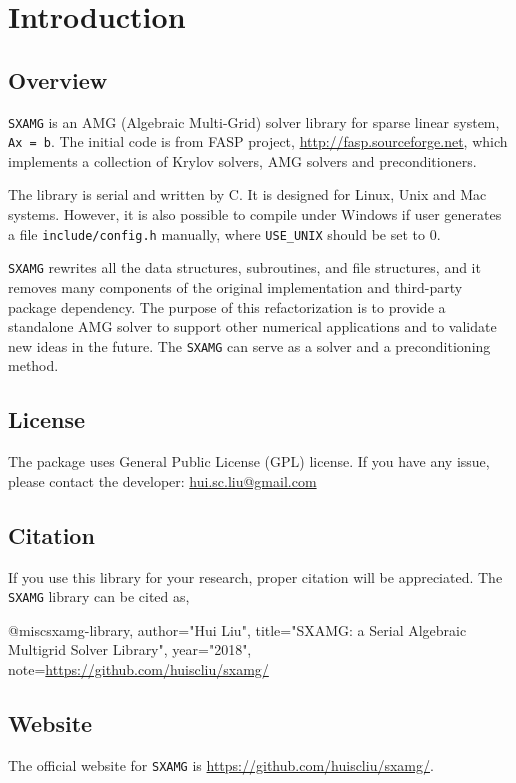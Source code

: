 
\chapter{Introduction}

\section{Overview}

\verb|SXAMG| is an AMG (Algebraic Multi-Grid) solver 
library for sparse linear system, \verb|Ax = b|. 
The initial code is from FASP project, \url{http://fasp.sourceforge.net}, which implements a collection of Krylov solvers, AMG solvers and preconditioners.

The library is serial and written by C.
It is designed for Linux, Unix and Mac systems. However, 
it is also possible to compile under Windows if user generates a file \verb|include/config.h| manually,
where \verb|USE_UNIX| should be set to 0. 

\verb|SXAMG| rewrites all the data structures, subroutines, and file structures, and it removes many components of the original implementation and third-party package dependency.
The purpose of this refactorization is to provide a standalone AMG solver to support 
other numerical applications and to validate new ideas in the future. 
The \verb|SXAMG| can serve as a solver and a preconditioning method.

\section{License}

The package uses General Public License (GPL) license. 
If you have any issue, please contact the developer: \href{mailto: hui.sc.liu@gmail.com}{hui.sc.liu@gmail.com}

\section{Citation}

If you use this library for your research, proper citation will be appreciated.
The \verb|SXAMG| library can be cited as,
\begin{evb}
@misc{sxamg-library,
    author="Hui Liu",
    title="SXAMG: a Serial Algebraic Multigrid Solver Library",
    year="2018",
    note={\url{https://github.com/huiscliu/sxamg/}}
}
\end{evb}


\section{Website}
The official website for \verb|SXAMG| is \url{https://github.com/huiscliu/sxamg/}.

